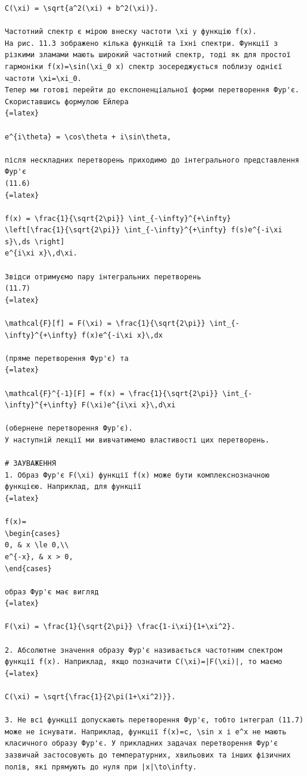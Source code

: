 \documentclass[
  ukrainian,
]{article}
\begin{document}
\begin{verbatim}
C(\xi) = \sqrt{a^2(\xi) + b^2(\xi)}.

Частотний спектр є мірою внеску частоти \xi у функцію f(x).
На рис. 11.3 зображено кілька функцій та їхні спектри. Функції з різкими зламами мають широкий частотний спектр, тоді як для простої гармоніки f(x)=\sin(\xi_0 x) спектр зосереджується поблизу однієї частоти \xi=\xi_0.
Тепер ми готові перейти до експоненціальної форми перетворення Фур'є. Скориставшись формулою Ейлера
{=latex}

e^{i\theta} = \cos\theta + i\sin\theta,

після нескладних перетворень приходимо до інтегрального представлення Фур'є
(11.6)
{=latex}

f(x) = \frac{1}{\sqrt{2\pi}} \int_{-\infty}^{+\infty}
\left[\frac{1}{\sqrt{2\pi}} \int_{-\infty}^{+\infty} f(s)e^{-i\xi s}\,ds \right]
e^{i\xi x}\,d\xi.

Звідси отримуємо пару інтегральних перетворень
(11.7)
{=latex}

\mathcal{F}[f] = F(\xi) = \frac{1}{\sqrt{2\pi}} \int_{-\infty}^{+\infty} f(x)e^{-i\xi x}\,dx

(пряме перетворення Фур'є) та
{=latex}

\mathcal{F}^{-1}[F] = f(x) = \frac{1}{\sqrt{2\pi}} \int_{-\infty}^{+\infty} F(\xi)e^{i\xi x}\,d\xi

(обернене перетворення Фур'є).
У наступній лекції ми вивчатимемо властивості цих перетворень.

# ЗАУВАЖЕННЯ
1. Образ Фур'є F(\xi) функції f(x) може бути комплекснозначною функцією. Наприклад, для функції
{=latex}

f(x)=
\begin{cases}
0, & x \le 0,\\
e^{-x}, & x > 0,
\end{cases}

образ Фур'є має вигляд
{=latex}

F(\xi) = \frac{1}{\sqrt{2\pi}} \frac{1-i\xi}{1+\xi^2}.

2. Абсолютне значення образу Фур'є називається частотним спектром функції f(x). Наприклад, якщо позначити C(\xi)=|F(\xi)|, то маємо
{=latex}

C(\xi) = \sqrt{\frac{1}{2\pi(1+\xi^2)}}.

3. Не всі функції допускають перетворення Фур'є, тобто інтеграл (11.7) може не існувати. Наприклад, функції f(x)=c, \sin x і e^x не мають класичного образу Фур'є. У прикладних задачах перетворення Фур'є зазвичай застосовують до температурних, хвильових та інших фізичних полів, які прямують до нуля при |x|\to\infty.


\end{verbatim}
\end{document}
